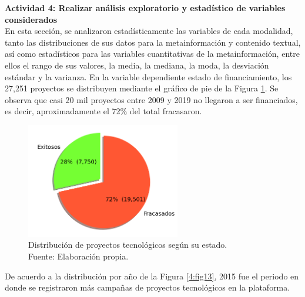 \textbf{Actividad 4: Realizar análisis exploratorio y estadístico de variables considerados}
\\
En esta sección, se analizaron estadísticamente las variables de cada modalidad, tanto las distribuciones de sus datos para la metainformación y contenido textual, así como estadísticos para las variables cuantitativas de la metainformación, entre ellos el rango de sus valores, la media, la mediana, la moda, la desviación estándar y la varianza. En la variable dependiente estado de financiamiento, los 27,251 proyectos se distribuyen mediante el gráfico de pie de la Figura \ref{4:fig12}. Se observa que casi 20 mil proyectos entre 2009 y 2019 no llegaron a ser financiados, es decir, aproximadamente el 72\% del total fracasaron.

\begin{figure}[!ht]
	\begin{center}
		\includegraphics[width=0.60\textwidth]{4/figures/projects by state.png}
		\caption[Distribución de proyectos tecnológicos según su estado]{Distribución de proyectos tecnológicos según su estado.\\
			Fuente: Elaboración propia.}
		\label{4:fig12}
	\end{center}
\end{figure}

\newpage
De acuerdo a la distribución por año de la Figura \ref{4:fig13}, 2015 fue el periodo en donde se registraron más campañas de proyectos tecnológicos en la plataforma.

